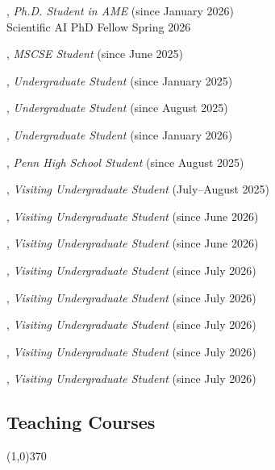 \documentclass[10pt]{article}
\newenvironment{myindentpar}[1]%
{\begin{list}{}%
         {\setlength{\leftmargin}{#1}}%
         \item[]%
}
{\end{list}}
\newcounter{list}
\begin{document}
\begin{myindentpar}{0.75cm}
\hspace{-0.75cm}{\bf Renzheng Zhang}, \textit{Ph.D. Student in AME} (since January 2026) \\
	{Scientific AI PhD Fellow Spring 2026}

\hspace{-0.75cm}{\bf Cesar Cervera}, \textit{MSCSE Student} (since June 2025)

\hspace{-0.75cm}{\bf Thomas Mitchell}, \textit{Undergraduate Student} (since January 2025)

\hspace{-0.75cm}{\bf Patrick Williams}, \textit{Undergraduate Student} (since August 2025)

\hspace{-0.75cm}{\bf Kristofer Ulanday}, \textit{Undergraduate Student} (since January 2026)

\hspace{-0.75cm}{\bf Vazgen Manukyan}, \textit{Penn High School Student} (since August 2025)

\hspace{-0.75cm}{\bf Xuanjia Qiao}, \textit{Visiting Undergraduate Student} (July--August 2025)

\hspace{-0.75cm}{\bf Mingyue Cui}, \textit{Visiting Undergraduate Student} (since June 2026)

\hspace{-0.75cm}{\bf Yingying Guo}, \textit{Visiting Undergraduate Student} (since June 2026)

\hspace{-0.75cm}{\bf Zimin Chen}, \textit{Visiting Undergraduate Student} (since July 2026)

\hspace{-0.75cm}{\bf Huipeng Huang}, \textit{Visiting Undergraduate Student} (since July 2026)

\hspace{-0.75cm}{\bf Xingyu Li}, \textit{Visiting Undergraduate Student} (since July 2026)

\hspace{-0.75cm}{\bf Yukai Wang}, \textit{Visiting Undergraduate Student} (since July 2026)

\hspace{-0.75cm}{\bf Jinchen Zhang}, \textit{Visiting Undergraduate Student} (since July 2026)

\end{myindentpar}

\subsection{\sc Teaching Courses}
\vspace{-0.4cm} \line(1,0){370} \vspace{-0.1cm}
\end{document}
